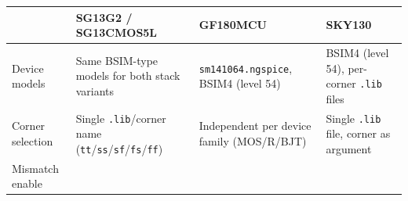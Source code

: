 \documentclass[
]{article}
\begin{document}
\begin{longtable}[]{@{}llll@{}}
\toprule
\begin{minipage}[b]{0.22\columnwidth}\raggedright
\strut
\end{minipage} & \begin{minipage}[b]{0.22\columnwidth}\raggedright
SG13G2 / SG13CMOS5L\strut
\end{minipage} & \begin{minipage}[b]{0.22\columnwidth}\raggedright
GF180MCU\strut
\end{minipage} & \begin{minipage}[b]{0.22\columnwidth}\raggedright
SKY130\strut
\end{minipage}\tabularnewline
\midrule
\endhead
\begin{minipage}[t]{0.22\columnwidth}\raggedright
Device models\strut
\end{minipage} & \begin{minipage}[t]{0.22\columnwidth}\raggedright
Same BSIM-type models for both stack variants\strut
\end{minipage} & \begin{minipage}[t]{0.22\columnwidth}\raggedright
\texttt{sm141064.ngspice}, BSIM4 (level 54)\strut
\end{minipage} & \begin{minipage}[t]{0.22\columnwidth}\raggedright
BSIM4 (level 54), per-corner \texttt{.lib} files\strut
\end{minipage}\tabularnewline
\begin{minipage}[t]{0.22\columnwidth}\raggedright
Corner selection\strut
\end{minipage} & \begin{minipage}[t]{0.22\columnwidth}\raggedright
Single \texttt{.lib}/corner name
(\texttt{tt}/\texttt{ss}/\texttt{sf}/\texttt{fs}/\texttt{ff})\strut
\end{minipage} & \begin{minipage}[t]{0.22\columnwidth}\raggedright
Independent per device family (MOS/R/BJT)\strut
\end{minipage} & \begin{minipage}[t]{0.22\columnwidth}\raggedright
Single \texttt{.lib} file, corner as argument\strut
\end{minipage}\tabularnewline
\begin{minipage}[t]{0.22\columnwidth}\raggedright
Mismatch enable\strut
\end{minipage} & \begin{minipage}[t]{0.22\columnwidth}\raggedright

\end{minipage}
\end{longtable}
\end{document}
